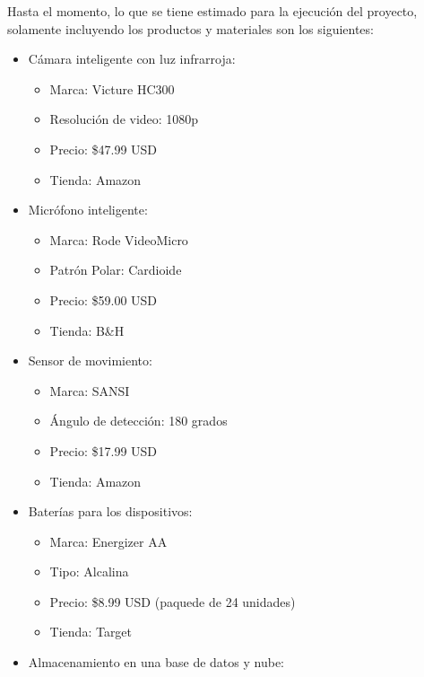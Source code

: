 \begin{comment}
Se debe registrar aquí el costo de los materiales usados hasta el momento, así como del diseño y del montaje de la solución propuesta, teniendo en cuenta el costo del recurso humano que participó en el proyecto.
\end{comment}
Hasta el momento, lo que se tiene estimado para la ejecución del proyecto, solamente incluyendo los productos y materiales son los siguientes:
\begin{itemize}
    \item Cámara inteligente con luz infrarroja:
    \begin{itemize}
        \item Marca: Victure HC300
        \item Resolución de video: 1080p
        \item Precio: \$47.99 USD
        \item Tienda: Amazon 
    \end{itemize}
    \item Micrófono inteligente:
    \begin{itemize}
        \item Marca: Rode VideoMicro
        \item Patrón Polar: Cardioide
        \item Precio: \$59.00 USD
        \item Tienda: B\&H 
    \end{itemize}
    \item Sensor de movimiento:
    \begin{itemize}
        \item Marca: SANSI
        \item Ángulo de detección: 180 grados
        \item Precio: \$17.99 USD
        \item Tienda: Amazon 
    \end{itemize}
    \item Baterías para los dispositivos:
    \begin{itemize}
        \item Marca: Energizer AA
        \item Tipo: Alcalina
        \item Precio: \$8.99 USD (paquede de 24 unidades)
        \item Tienda: Target
    \end{itemize}
    \item Almacenamiento en una base de datos y nube:

\end{itemize}
